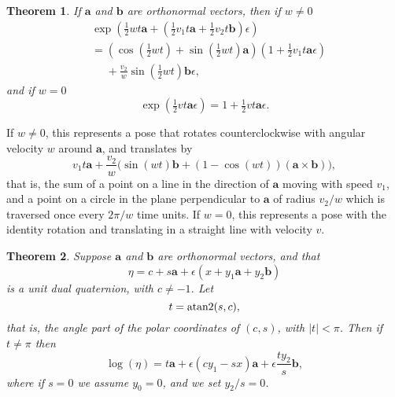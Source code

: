 \documentclass[reqno,12pt]{amsart}
\newtheorem{theorem}{Theorem}
\begin{document}
\begin{theorem}
\label{exp dq}
If $\bm a$ and $\bm b$ are orthonormal vectors, then if $w \ne 0$
\label{exp theta}
\begin{equation}
\begin{aligned}
& \exp\left(\tfrac12wt \bm a + (\tfrac12v_1t \bm a + \tfrac12v_2t \bm b) \epsilon\right) \\
&= \left(\cos(\tfrac12wt) + \sin(\tfrac12wt) \bm a\right) \left(1 + \tfrac12 v_1t \bm a \epsilon\right) \\
&\phantom{{}={}} + \frac {v_2}w\sin(\tfrac12 wt) \bm b \epsilon ,
\end{aligned}
\end{equation}
and if $w = 0$
\begin{equation}
\exp\left(\tfrac12 vt \bm a \epsilon\right) = 1 + \tfrac12 v t \bm a \epsilon .
\end{equation}
\end{theorem}
If $w \ne 0$, this represents a pose that rotates counterclockwise with angular velocity $w$ around $\bm a$, and translates by
\begin{equation*}
v_1 t \bm a + \frac {v_2}w\bigl(\sin(wt)  \bm b + (1-\cos(wt)) (\bm a \times \bm b) \bigr) ,
\end{equation*}
that is, the sum of a point on a line in the direction of $\bm a$ moving with speed $v_1$, and a point on a circle in the plane perpendicular to $\bm a$ of radius $v_2/w$ which is traversed once every $2\pi/w$ time units.  If $w = 0$, this represents a pose with the identity rotation and translating in a straight line with velocity $v$.

\begin{theorem}
\label{log dq}
Suppose $\bm a$ and $\bm b$ are orthonormal vectors, and that
\begin{equation}
\label{eta for log}
\eta = c + s \bm a + \epsilon (x + y_1 \bm a + y_2 \bm b)
\end{equation}
is a unit dual quaternion, with $c \ne -1$.  Let
\begin{equation}
t = \text{\rm atan2}(s,c),
\end{equation}
that is, the angle part of the polar coordinates of $(c,s)$, with $|t| < \pi$.  Then if $t \ne \pi$ then
\begin{equation}
\log(\eta) = t \bm a + \epsilon (c y_1 - s x ) \bm a
+ \epsilon \frac{t y_2}{s} \bm b,
\end{equation}
where if $s = 0$ we assume $y_0 = 0$, and we set $y_2/s = 0$.
\end{theorem}
\end{document}
